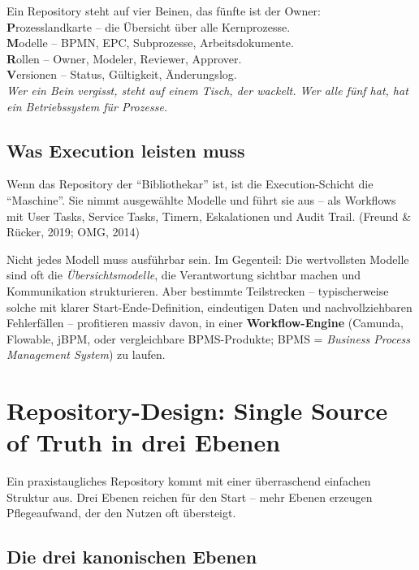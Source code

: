 \documentclass[11pt,a4paper,oneside]{article}
\newcommand{\caveatfontfallback}{\itshape}
\newcommand\caveatfont{\caveatfontfallback}%
\newcommand{\akzent}[1]{{\caveatfont\color{lpAmber}#1}}
\newcommand{\fachbegriff}[1]{\textbf{#1}}
\newcommand{\quelle}[1]{{\footnotesize\color{lpGray}(#1)}}
\begin{document}
\begin{eselsbox}[Eselsbrücke: \akzent{P-M-R-V}]
Ein Repository steht auf vier Beinen, das fünfte ist der Owner:\\[2pt]
\textbf{P}rozesslandkarte -- die Übersicht über alle Kernprozesse.\\
\textbf{M}odelle -- BPMN, EPC, Subprozesse, Arbeitsdokumente.\\
\textbf{R}ollen -- Owner, Modeler, Reviewer, Approver.\\
\textbf{V}ersionen -- Status, Gültigkeit, Änderungslog.\\[2pt]
\emph{Wer ein Bein vergisst, steht auf einem Tisch, der wackelt. Wer alle fünf hat, hat ein Betriebssystem für Prozesse.}
\end{eselsbox}

\subsection{Was Execution leisten muss}

Wenn das Repository der ``Bibliothekar'' ist, ist die Execution-Schicht die ``Maschine''. Sie nimmt ausgewählte Modelle und führt sie aus -- als Workflows mit User Tasks, Service Tasks, Timern, Eskalationen und Audit Trail. \quelle{Freund \& Rücker, 2019; OMG, 2014}

Nicht jedes Modell muss ausführbar sein. Im Gegenteil: Die wertvollsten Modelle sind oft die \emph{Übersichtsmodelle}, die Verantwortung sichtbar machen und Kommunikation strukturieren. Aber bestimmte Teilstrecken -- typischerweise solche mit klarer Start-Ende-Definition, eindeutigen Daten und nachvollziehbaren Fehlerfällen -- profitieren massiv davon, in einer \fachbegriff{Workflow-Engine} (Camunda, Flowable, jBPM, oder vergleichbare BPMS-Produkte; BPMS = \emph{Business Process Management System}) zu laufen.

\section{Repository-Design: Single Source of Truth in drei Ebenen}

Ein praxistaugliches Repository kommt mit einer überraschend einfachen Struktur aus. Drei Ebenen reichen für den Start -- mehr Ebenen erzeugen Pflegeaufwand, der den Nutzen oft übersteigt.

\subsection{Die drei kanonischen Ebenen}
\end{document}
